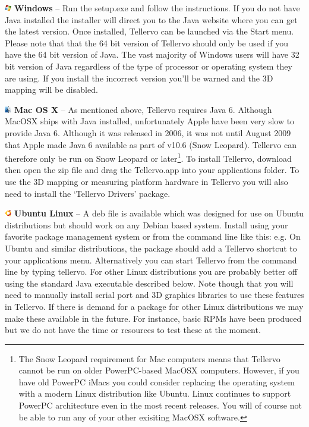 \begin{description}
\item \includegraphics[width=3mm]{Images/windows.png} \textbf{Windows} -- Run the setup.exe and follow the instructions. If you do not have Java installed the installer will direct you to the Java website where you can get the latest version. Once installed, Tellervo can be launched via the Start menu.  Please note that that the 64 bit version of Tellervo should only be used if you have the 64 bit version of Java.  The vast majority of Windows users will have 32 bit version of Java regardless of the type of processor or operating system they are using. If you install the incorrect version you'll be warned and the 3D mapping will be disabled.

\item \includegraphics[width=3mm]{Images/mac.png} \textbf{Mac OS X} -- As mentioned above, Tellervo requires Java 6. Although MacOSX ships with Java installed, unfortunately Apple have been very slow to provide Java 6. Although it was released in 2006, it was not until August 2009 that Apple made Java 6 available as part of v10.6 (Snow Leopard). Tellervo can therefore only be run on Snow Leopard or later\footnote{The Snow Leopard requirement for Mac computers means that Tellervo cannot be run on older PowerPC-based MacOSX computers.  However, if you have old PowerPC iMacs you could consider replacing the operating system with a modern Linux distribution like Ubuntu.  Linux continues to support PowerPC architecture even in the most recent releases.  You will of course not be able to run any of your other exisiting MacOSX software.}. To install Tellervo, download then open the zip file and drag the Tellervo.app into your applications folder.  To use the 3D mapping or measuring platform hardware in Tellervo you 
will also need to install the `Tellervo Drivers' package.  

\item \includegraphics[width=3mm]{Images/ubuntu.png} \textbf{Ubuntu Linux} --  A deb file is available which was designed for use on Ubuntu distributions but should work on any Debian based system. Install using your favorite package management system or from the command line like this: e.g.  On Ubuntu and similar distributions, the package should add a Tellervo shortcut to your applications menu. Alternatively you can start Tellervo from the command line by typing tellervo.  For other Linux distributions you are probably better off using the standard Java executable described below.  Note though that you will need to manually install serial port and 3D graphics libraries to use these features in Tellervo.  If there is demand for a package for other Linux distributions we may make these available in the future.  For instance, basic RPMs have been produced but we do not have the time or resources to test these at the moment.


\end{description}
